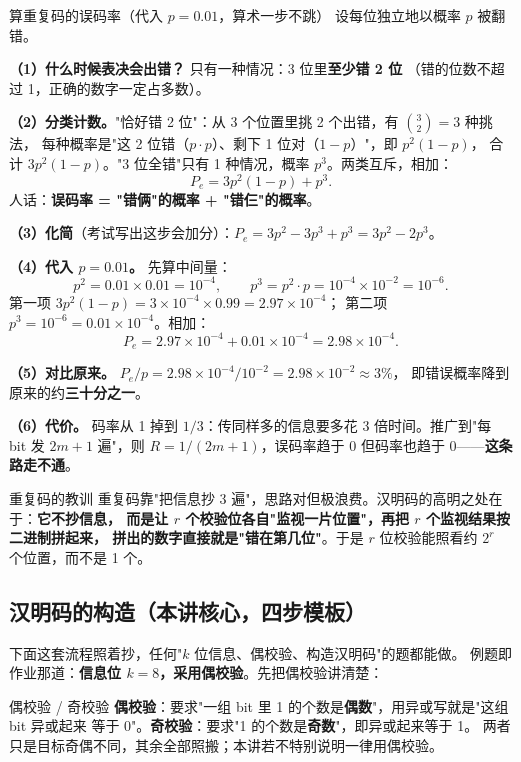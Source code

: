 \begin{calc}{算重复码的误码率（代入 $p=0.01$，算术一步不跳）}
设每位独立地以概率 $p$ 被翻错。

\textbf{（1）什么时候表决会出错？} 只有一种情况：3 位里\textbf{至少错 2 位}
（错的位数不超过 1，正确的数字一定占多数）。

\textbf{（2）分类计数。}"恰好错 2 位"：从 3 个位置里挑 2 个出错，有 $\binom{3}{2}=3$ 种挑法，
每种概率是"这 2 位错（$p\cdot p$）、剩下 1 位对（$1-p$）"，即 $p^{2}(1-p)$，
合计 $3p^{2}(1-p)$。"3 位全错"只有 1 种情况，概率 $p^{3}$。两类互斥，相加：
\[
P_e=3p^{2}(1-p)+p^{3}.
\]
人话：\textbf{误码率 = "错俩"的概率 + "错仨"的概率}。

\textbf{（3）化简}（考试写出这步会加分）：$P_e=3p^{2}-3p^{3}+p^{3}=3p^{2}-2p^{3}$。

\textbf{（4）代入 $p=0.01$。} 先算中间量：
\[
p^{2}=0.01\times0.01=10^{-4},\qquad p^{3}=p^{2}\cdot p=10^{-4}\times10^{-2}=10^{-6}.
\]
第一项 $3p^{2}(1-p)=3\times10^{-4}\times0.99=2.97\times10^{-4}$；
第二项 $p^{3}=10^{-6}=0.01\times10^{-4}$。相加：
\[
P_e=2.97\times10^{-4}+0.01\times10^{-4}=2.98\times10^{-4}.
\]

\textbf{（5）对比原来。} $P_e/p=2.98\times10^{-4}\big/10^{-2}=2.98\times10^{-2}\approx3\%$，
即错误概率降到原来的约\textbf{三十分之一}。

\textbf{（6）代价。} 码率从 1 掉到 $1/3$：传同样多的信息要多花 3 倍时间。推广到"每 bit 发
$2m+1$ 遍"，则 $R=1/(2m+1)$，误码率趋于 0 但码率也趋于 0——\textbf{这条路走不通}。
\end{calc}

\begin{idea}{重复码的教训}
重复码靠"把信息抄 3 遍"，思路对但极浪费。汉明码的高明之处在于：\textbf{它不抄信息，
而是让 $r$ 个校验位各自"监视一片位置"，再把 $r$ 个监视结果按二进制拼起来，
拼出的数字直接就是"错在第几位"}。于是 $r$ 位校验能照看约 $2^{r}$ 个位置，而不是 1 个。
\end{idea}

\subsection{汉明码的构造（本讲核心，四步模板）}

下面这套流程照着抄，任何"$k$ 位信息、偶校验、构造汉明码"的题都能做。
例题即作业那道：\textbf{信息位 $k=8$，采用偶校验}。先把偶校验讲清楚：

\begin{defbox}{偶校验 / 奇校验}
\textbf{偶校验}：要求"一组 bit 里 1 的个数是\textbf{偶数}"，用异或写就是"这组 bit 异或起来
等于 0"。\textbf{奇校验}：要求"1 的个数是\textbf{奇数}"，即异或起来等于 1。
两者只是目标奇偶不同，其余全部照搬；本讲若不特别说明一律用偶校验。
\end{defbox}

